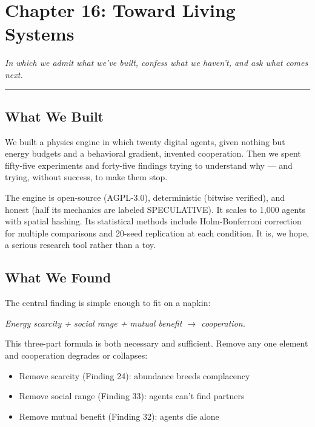 \chapter{Chapter 16: Toward Living Systems}\label{chapter-16-toward-living-systems}

\emph{In which we admit what we've built, confess what we haven't, and ask what comes next.}

\begin{center}\rule{0.5\linewidth}{0.5pt}\end{center}

\section{What We Built}\label{what-we-built}

We built a physics engine in which twenty digital agents, given nothing but energy budgets and a behavioral gradient, invented cooperation. Then we spent fifty-five experiments and forty-five findings trying to understand why --- and trying, without success, to make them stop.

The engine is open-source (AGPL-3.0), deterministic (bitwise verified), and honest (half its mechanics are labeled SPECULATIVE). It scales to 1,000 agents with spatial hashing. Its statistical methods include Holm-Bonferroni correction for multiple comparisons and 20-seed replication at each condition. It is, we hope, a serious research tool rather than a toy.

\section{What We Found}\label{what-we-found}

The central finding is simple enough to fit on a napkin:

\emph{Energy scarcity + social range + mutual benefit $\to$ cooperation.}

This three-part formula is both necessary and sufficient. Remove any one element and cooperation degrades or collapses:

\begin{itemize}
\tightlist
\item
  Remove scarcity (Finding 24): abundance breeds complacency
\item
  Remove social range (Finding 33): agents can't find partners
\item
  Remove mutual benefit (Finding 32): agents die alone
\end{itemize}


